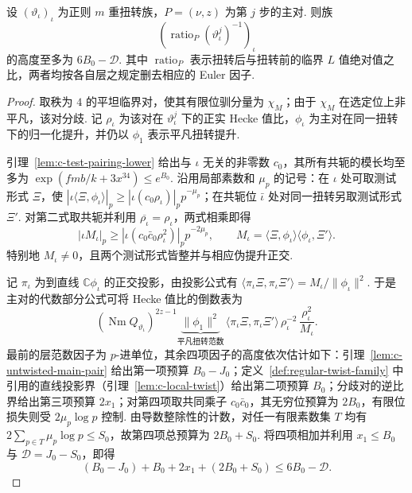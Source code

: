 \begin{lemma}
\label{lem:c-main-pair-height}
\emitthmsource
设 $(\vartheta_\iota)_\iota$ 为正则 $m$ 重扭转族，$P=(\nu,z)$ 为第 $j$ 步的主对. 则族
\[
 \left(\operatorname{ratio}_{P}(\vartheta_\iota^j)^{-1}\right)_\iota
\]
的高度至多为 $6B_0-\mathcal D$. 其中 $\operatorname{ratio}_{P}$ 表示扭转后与扭转前的临界 $L$ 值绝对值之比，两者均按各自层之规定删去相应的 Euler 因子.
\end{lemma}
\begin{proof}
取秩为 $4$ 的平坦临界对，使其有限位驯分量为 $\chi_M$；由于 $\chi_M$ 在选定位上非平凡，该对分歧. 记 $\rho_\iota$ 为该对在 $\vartheta_\iota^j$ 下的正实 Hecke 值比，$\phi_\iota$ 为主对在同一扭转下的归一化提升，并仍以 $\phi_1$ 表示平凡扭转提升.

引理~\ref{lem:c-test-pairing-lower} 给出与 $\iota$ 无关的非零数 $c_0$，其所有共轭的模长均至多为 $\exp(fmb/k+3x^{34})\le e^{B_0}$. 沿用局部素数和 $\mu_p$ 的记号：在 $\iota$ 处可取测试形式 $\Xi$，使 $|\iota\langle\Xi,\phi_\iota\rangle|_p\ge |\iota(c_0\rho_\iota)|_p p^{-\mu_p}$；在共轭位 $\bar\iota$ 处对同一扭转另取测试形式 $\Xi'$. 对第二式取共轭并利用 $\overline{\rho_\iota}=\rho_\iota$，两式相乘即得
\[
 |\iota M_\iota|_p\ge
 |\iota(c_0\bar c_0\rho_\iota^2)|_p p^{-2\mu_p},
 \qquad M_\iota=\langle\Xi,\phi_\iota\rangle
                        \langle\phi_\iota,\Xi'\rangle .
\]
特别地 $M_\iota\ne0$，且两个测试形式皆整并与相应伪提升正交.

记 $\pi_\iota$ 为到直线 $\mathbb C\phi_\iota$ 的正交投影，由投影公式有 $\langle\pi_\iota\Xi,\pi_\iota\Xi'\rangle=M_\iota/\|\phi_\iota\|^2$. 于是主对的代数部分公式可将 Hecke 值比的倒数表为
\[
 (\operatorname{Nm} Q_{\vartheta_\iota})^{2z-1}
 \underbrace{\|\phi_1\|^2}_{\text{平凡扭转范数}}\,
 \langle\pi_\iota\Xi,\pi_\iota\Xi'\rangle\,
 \rho_\iota^{-2}\,\frac{\rho_\iota^2}{M_\iota}.
\]
最前的层范数因子为 $p$-进单位，其余四项因子的高度依次估计如下：引理~\ref{lem:c-untwisted-main-pair} 给出第一项预算 $B_0-J_0$；定义~\ref{def:regular-twist-family} 中引用的直线投影界（引理~\ref{lem:c-local-twist}）给出第二项预算 $B_0$；分歧对的逆比界给出第三项预算 $2x_1$；对第四项取共同乘子 $c_0\bar c_0$，其无穷位预算为 $2B_0$，有限位损失则受 $2\mu_p\log p$ 控制. 由导数整除性的计数，对任一有限素数集 $T$ 均有 $2\sum_{p\in T}\mu_p\log p\le S_0$，故第四项总预算为 $2B_0+S_0$. 将四项相加并利用 $x_1\le B_0$ 与 $\mathcal D=J_0-S_0$，即得
\[
 (B_0-J_0)+B_0+2x_1+(2B_0+S_0)
 \le6B_0-\mathcal D .
\]
\end{proof}

